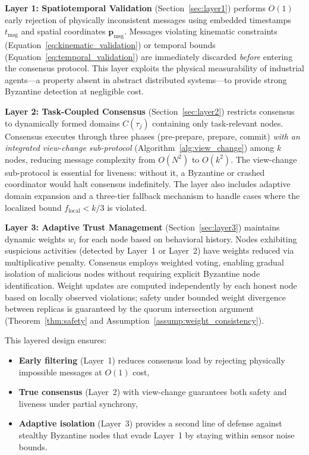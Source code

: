 \documentclass[manuscript,screen,review]{acmart}
\begin{document}
\textbf{Layer 1: Spatiotemporal Validation} (Section~\ref{sec:layer1}) performs $O(1)$ early rejection of physically inconsistent messages using embedded timestamps $t_{\text{msg}}$ and spatial coordinates $\mathbf{p}_{\text{msg}}$. Messages violating kinematic constraints (Equation~\ref{eq:kinematic_validation}) or temporal bounds (Equation~\ref{eq:temporal_validation}) are immediately discarded \textit{before} entering the consensus protocol. This layer exploits the physical measurability of industrial agents---a property absent in abstract distributed systems---to provide strong Byzantine detection at negligible cost.

\textbf{Layer 2: Task-Coupled Consensus} (Section~\ref{sec:layer2}) restricts consensus to dynamically formed domains $C(\tau_j)$ containing only task-relevant nodes. Consensus executes through three phases (pre-prepare, prepare, commit) \textit{with an integrated view-change sub-protocol} (Algorithm~\ref{alg:view_change}) among $k$ nodes, reducing message complexity from $O(N^2)$ to $O(k^2)$. The view-change sub-protocol is essential for liveness: without it, a Byzantine or crashed coordinator would halt consensus indefinitely. The layer also includes adaptive domain expansion and a three-tier fallback mechanism to handle cases where the localized bound $f_{\text{local}} < k/3$ is violated.

\textbf{Layer 3: Adaptive Trust Management} (Section~\ref{sec:layer3}) maintains dynamic weights $w_i$ for each node based on behavioral history. Nodes exhibiting suspicious activities (detected by Layer~1 or Layer~2) have weights reduced via multiplicative penalty. Consensus employs weighted voting, enabling gradual isolation of malicious nodes without requiring explicit Byzantine node identification. Weight updates are computed independently by each honest node based on locally observed violations; safety under bounded weight divergence between replicas is guaranteed by the quorum intersection argument (Theorem~\ref{thm:safety} and Assumption~\ref{assump:weight_consistency}).

This layered design ensures:
\begin{itemize}
\item \textbf{Early filtering} (Layer~1) reduces consensus load by rejecting physically impossible messages at $O(1)$ cost,
\item \textbf{True consensus} (Layer~2) with view-change guarantees both safety and liveness under partial synchrony,
\item \textbf{Adaptive isolation} (Layer~3) provides a second line of defense against stealthy Byzantine nodes that evade Layer~1 by staying within sensor noise bounds.
\end{itemize}
\end{document}
